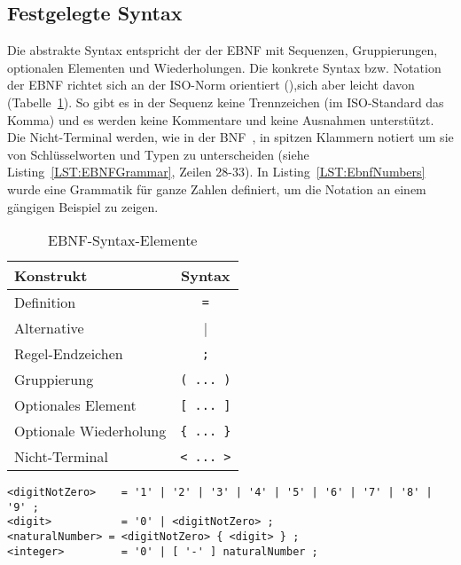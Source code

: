 \documentclass[../InterneDSLs.tex]{subfiles}
\begin{document}
\subsection{Festgelegte Syntax}\label{SEC:SetSyntax}
Die abstrakte Syntax entspricht der der EBNF mit Sequenzen, Gruppierungen, optionalen Elementen und Wiederholungen. Die konkrete Syntax bzw. Notation der EBNF richtet sich an der ISO-Norm orientiert (\cite[S. 7]{scowen1996international}),sich aber leicht davon (Tabelle~\ref{TAB:EBNFSyntax}). So gibt es in der Sequenz keine Trennzeichen (im ISO-Standard das Komma) und es werden keine Kommentare und keine Ausnahmen unterstützt. Die Nicht-Terminal werden, wie in der BNF~\cite[S. 3]{crocker1997augmented}, in spitzen Klammern notiert um sie von Schlüsselworten und Typen zu unterscheiden (siehe Listing~\ref{LST:EBNFGrammar}, Zeilen 28-33). In Listing~\ref{LST:EbnfNumbers} wurde eine Grammatik für ganze Zahlen definiert, um die Notation an einem gängigen Beispiel zu zeigen.

\begin{table}[ht]
\centering
\begin{tabular}{l|c}
\textbf{Konstrukt}     & \textbf{Syntax}\\\hline
Definition             & \verb|=|\\
Alternative            & |\\
Regel-Endzeichen       & \verb|;|\\
Gruppierung            & \verb|( ... )|\\
Optionales Element     & \verb|[ ... ]|\\
Optionale Wiederholung & \verb|{ ... }|\\
Nicht-Terminal         & \verb|< ... >|\\
\end{tabular}
\caption{EBNF-Syntax-Elemente}
\label{TAB:EBNFSyntax}
\end{table}

\begin{lstlisting}[caption={Zahlen in der festgelegten Notation},label={LST:EbnfNumbers}]
<digitNotZero>    = '1' | '2' | '3' | '4' | '5' | '6' | '7' | '8' | '9' ;
<digit>           = '0' | <digitNotZero> ;
<naturalNumber> = <digitNotZero> { <digit> } ;
<integer>         = '0' | [ '-' ] naturalNumber ;
\end{lstlisting}

\begin{figure}[ht]

\end{figure}
\end{document}
